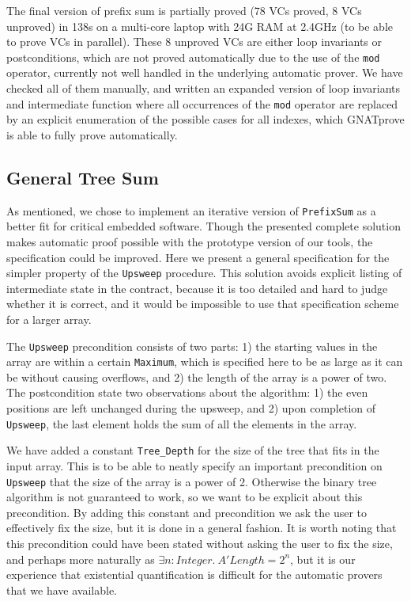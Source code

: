 \documentclass[sttt,final]{svjour}
\newcommand{\gnatprove}{GNATprove\xspace}
\begin{document}
The final version of prefix sum is partially proved (78 VCs proved, 8 VCs
%
%
unproved) in 138s on a multi-core laptop with 24G RAM at 2.4GHz (to
be able to prove VCs in parallel).  These 8 unproved VCs are either loop
invariants or postconditions, which are not proved automatically due to the use
of the \verb|mod| operator, currently not well handled in the underlying
automatic prover. We have checked all of them manually, and written an expanded
version of loop invariants and intermediate function where all occurrences of
the \verb|mod| operator are replaced by an explicit enumeration of the possible
cases for all indexes, which \gnatprove is able to fully prove automatically.

\subsection{General Tree Sum}
\label{solution2general}
As mentioned, we chose to implement an iterative version of
\verb|PrefixSum| as a better fit for critical embedded software.
Though the presented complete solution makes automatic
proof possible with the prototype version of our tools,
the specification could be improved. Here we present
a general specification for the simpler property of the \verb|Upsweep|
procedure. This solution avoids explicit listing of intermediate state in the
contract, because it is too detailed and hard to judge whether it is
correct, and it would be impossible to use that specification scheme
for a larger array.

The \verb|Upsweep| precondition consists of two parts: 1) the starting
values in the array are within a certain \verb|Maximum|, which is
specified here to be as large as it can be without causing overflows,
and 2) the length of the array is a power of two. The postcondition
state two observations about the algorithm: 1) the even positions are
left unchanged during the upsweep, and 2) upon completion of
\verb|Upsweep|, the last element holds the sum of all the elements in
the array.

We have added a constant \verb|Tree_Depth| for the size of the tree
that fits in the input array. This is to be able to neatly specify an
important precondition on \verb|Upsweep| that the size of the array is
a power of 2. Otherwise the binary tree algorithm is not guaranteed to
work, so we want to be explicit about this precondition. By adding
this constant and precondition we ask the user to effectively fix the
size, but it is done in a general fashion. It is worth noting that
this precondition could have been stated without asking the user to fix
the size, and perhaps more naturally as $\exists n: \mathit{Integer}.~ A'\mathit{Length} = 2^n$, but it is our experience that existential quantification is
difficult for the automatic provers that we have available.
\end{document}
